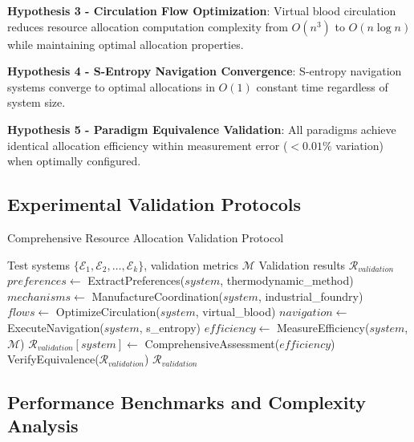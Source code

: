 \documentclass[12pt,a4paper]{article}
\begin{document}
\textbf{Hypothesis 3 - Circulation Flow Optimization}: Virtual blood circulation reduces resource allocation computation complexity from $O(n^3)$ to $O(n \log n)$ while maintaining optimal allocation properties.

\textbf{Hypothesis 4 - S-Entropy Navigation Convergence}: S-entropy navigation systems converge to optimal allocations in $O(1)$ constant time regardless of system size.

\textbf{Hypothesis 5 - Paradigm Equivalence Validation}: All paradigms achieve identical allocation efficiency within measurement error ($< 0.01\%$ variation) when optimally configured.

\subsection{Experimental Validation Protocols}

\begin{algorithm}
\caption{Comprehensive Resource Allocation Validation Protocol}
\begin{algorithmic}[1]
\Require Test systems $\{\mathcal{E}_1, \mathcal{E}_2, \ldots, \mathcal{E}_k\}$, validation metrics $\mathcal{M}$
\Ensure Validation results $\mathcal{R}_{validation}$
    \State $preferences \leftarrow$ ExtractPreferences($system$, thermodynamic\_method)
    \State $mechanisms \leftarrow$ ManufactureCoordination($system$, industrial\_foundry)
    \State $flows \leftarrow$ OptimizeCirculation($system$, virtual\_blood)
    \State $navigation \leftarrow$ ExecuteNavigation($system$, s\_entropy)
    \State $efficiency \leftarrow$ MeasureEfficiency($system$, $\mathcal{M}$)
    \State $\mathcal{R}_{validation}[system] \leftarrow$ ComprehensiveAssessment($efficiency$)
\EndFor
\State VerifyEquivalence($\mathcal{R}_{validation}$)
\Return $\mathcal{R}_{validation}$
\end{algorithmic}
\end{algorithm}

\subsection{Performance Benchmarks and Complexity Analysis}
\end{document}
